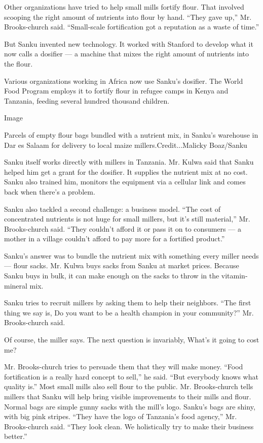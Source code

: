 Other organizations have tried to help small mills fortify flour. That
involved scooping the right amount of nutrients into flour by hand.
``They gave up,'' Mr. Brooks-church said. ``Small-scale fortification
got a reputation as a waste of time.''

But Sanku invented new technology. It worked with Stanford to develop
what it now calls a dosifier --- a machine that mixes the right amount
of nutrients into the flour.

Various organizations working in Africa now use Sanku's dosifier. The
World Food Program employs it to fortify flour in refugee camps in Kenya
and Tanzania, feeding several hundred thousand children.

Image

Parcels of empty flour bags bundled with a nutrient mix, in Sanku's
warehouse in Dar es Salaam for delivery to local maize
millers.Credit...Malicky Boaz/Sanku

Sanku itself works directly with millers in Tanzania. Mr. Kulwa said
that Sanku helped him get a grant for the dosifier. It supplies the
nutrient mix at no cost. Sanku also trained him, monitors the equipment
via a cellular link and comes back when there's a problem.

Sanku also tackled a second challenge: a business model. ``The cost of
concentrated nutrients is not huge for small millers, but it's still
material,'' Mr. Brooks-church said. ``They couldn't afford it or pass it
on to consumers --- a mother in a village couldn't afford to pay more
for a fortified product.''

Sanku's answer was to bundle the nutrient mix with something every
miller needs --- flour sacks. Mr. Kulwa buys sacks from Sanku at market
prices. Because Sanku buys in bulk, it can make enough on the sacks to
throw in the vitamin-mineral mix.

Sanku tries to recruit millers by asking them to help their neighbors.
``The first thing we say is, Do you want to be a health champion in your
community?'' Mr. Brooks-church said.

Of course, the miller says. The next question is invariably, What's it
going to cost me?

Mr. Brooks-church tries to persuade them that they will make money.
``Food fortification is a really hard concept to sell,'' he said. ``But
everybody knows what quality is.'' Most small mills also sell flour to
the public. Mr. Brooks-church tells millers that Sanku will help bring
visible improvements to their mills and flour. Normal bags are simple
gunny sacks with the mill's logo. Sanku's bags are shiny, with big pink
stripes. ``They have the logo of Tanzania's food agency,'' Mr.
Brooks-church said. ``They look clean. We holistically try to make their
business better.''

